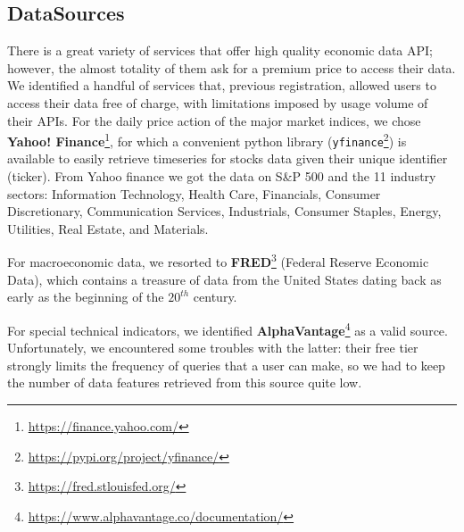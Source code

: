 \documentclass[10pt]{article} %
\begin{document}
\subsection{DataSources}
There is a great variety of services that offer high quality economic data API; however, the almost totality of them ask for a premium price to access their data. We identified a handful of services that, previous registration, allowed users to access their data free of charge, with limitations imposed by usage volume of their APIs.
For the daily price action of the major market indices, we chose \textbf{Yahoo! Finance}\footnote{\href{https://finance.yahoo.com/}{https://finance.yahoo.com/}}, for which a convenient python library (\texttt{yfinance}\footnote{\href{https://pypi.org/project/yfinance/}{https://pypi.org/project/yfinance/}}) is available to easily retrieve timeseries for stocks data given their unique identifier (ticker). From Yahoo finance we got the data on S\&P 500 and the 11 industry sectors: Information Technology, Health Care, Financials, Consumer Discretionary, Communication Services, Industrials, Consumer Staples, Energy, Utilities, Real Estate, and Materials. 

For macroeconomic data, we resorted to \textbf{FRED}\footnote{\href{https://fred.stlouisfed.org/}{https://fred.stlouisfed.org/}} (Federal Reserve Economic Data), which contains a treasure of data from the United States dating back as early as the beginning of the $20^{th}$ century.

For special technical indicators, we identified \textbf{AlphaVantage}\footnote{\href{https://www.alphavantage.co/documentation/}{https://www.alphavantage.co/documentation/}} as a valid source. Unfortunately, we encountered some troubles with the latter: their free tier strongly limits the frequency of queries that a user can make, so we had to keep the number of data features retrieved from this source quite low.

\end{document}
